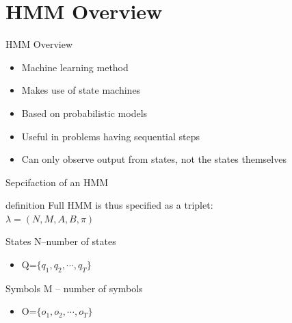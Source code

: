 \documentclass{beamer}
\begin{document}
\section{HMM Overview}
\begin{frame}{HMM Overview}
\begin{itemize}
\item Machine learning method
\item Makes use of state machines
\item Based on probabilistic models
\item Useful in problems having sequential steps
\item Can only observe output from states, not the states themselves
\end{itemize}
\end{frame}


\begin{frame}{Sepcifaction of an HMM}
    \begin{block}{definition}
        Full HMM is thus specified as a triplet:\\
        $\lambda = (N,M,A,B,\pi)$
    \end{block}

    \begin{block}{States}
    N--number of states
    \begin{itemize}
    \item Q=$\{ q_1, q_2, \cdots, q_T \}$
    \end{itemize}
    \end{block}

    \begin{block}{Symbols}
    M -- number of symbols
    \begin{itemize}
    \item O=$\{ o_1, o_2, \cdots, o_T \}$
    \end{itemize}
    \end{block}
\end{frame}
\end{document}
